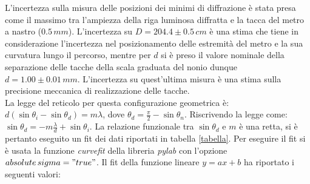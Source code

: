 \documentclass[10pt,a4paper]{article}
\begin{document}
L'incertezza sulla misura delle posizioni dei minimi di diffrazione è stata presa come il massimo tra l'ampiezza della riga luminosa diffratta e la tacca del metro a nastro ($0.5 \,mm$). L'incertezza su $D = 204.4 \pm 0.5 \, cm$ è una stima che tiene in considerazione l'incertezza nel posizionamento delle estremità del metro e la sua curvatura lungo il percorso, mentre per $d$ si è preso il valore nominale della separazione delle tacche della scala graduata del nonio dunque $d = 1.00 \pm 0.01 \, mm$. L'incertezza su quest'ultima misura è una stima sulla precisione meccanica di realizzazione delle tacche.\\
La legge del reticolo per questa configurazione geometrica è: $d(\sin  \theta_i - \sin \theta_d)  = m \lambda $, dove $\theta_d = \frac{\pi}{2} - \sin \theta_n $. Riscrivendo la legge come: $\sin \theta_d = -m \frac{\lambda}{d} + \sin \theta_i$. La relazione funzionale tra $\sin  \theta_d$ e $m$ è una retta, si è pertanto eseguito un fit dei dati riportati in tabella \ref{tabella}. Per eseguire il fit si è usata la funzione \emph{curvefit} della libreria \emph{pylab} con l'opzione \emph{$absolute\,sigma = "true"$}. Il fit della funzione lineare $y = ax+b$ ha riportato i seguenti valori: \\
\end{document}
